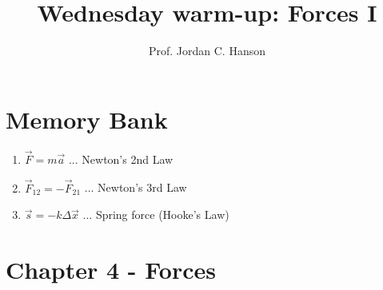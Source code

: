 \documentclass{article}
\begin{document}
\twocolumn

\title{Wednesday warm-up: Forces I}
\author{Prof. Jordan C. Hanson}

\maketitle

\section{Memory Bank}

\begin{enumerate}
\item $\vec{F} = m \vec{a}$ ... Newton's 2nd Law
\item $\vec{F}_{12} = -\vec{F}_{21}$ ... Newton's 3rd Law
\item $\vec{s} = -k \Delta\vec{x}$ ... Spring force (Hooke's Law)
\end{enumerate}

\section{Chapter 4 - Forces}
\end{document}
